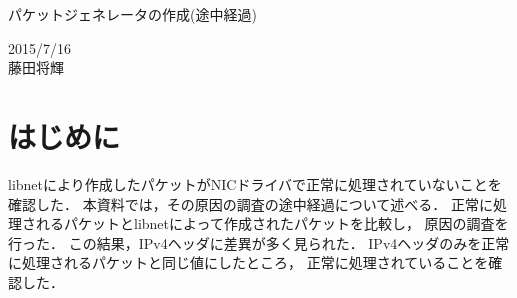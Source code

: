 \documentclass[12pt]{jsarticle}
\begin{document}

\begin{center}
    {\LARGE パケットジェネレータの作成(途中経過)}
\end{center}

\begin{flushright}
  2015/7/16\\
  藤田将輝
\end{flushright}
\section{はじめに}
libnetにより作成したパケットがNICドライバで正常に処理されていないことを確認した．
本資料では，その原因の調査の途中経過について述べる．
正常に処理されるパケットとlibnetによって作成されたパケットを比較し，
原因の調査を行った．
この結果，IPv4ヘッダに差異が多く見られた．
IPv4ヘッダのみを正常に処理されるパケットと同じ値にしたところ，
正常に処理されていることを確認した．
\end{document}
